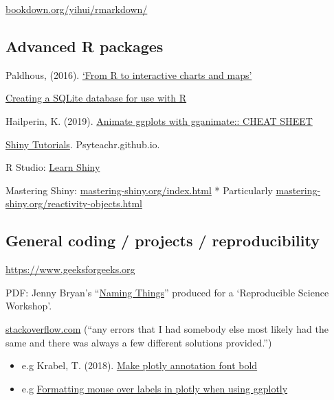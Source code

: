 \documentclass[
]{book}
\providecommand{\tightlist}{%
  \setlength{\itemsep}{0pt}\setlength{\parskip}{0pt}}
\begin{document}
\href{https://bookdown.org/yihui/rmarkdown/}{bookdown.org/yihui/rmarkdown/}

\hypertarget{advanced-r-packages}{%
\subsection{Advanced R packages}\label{advanced-r-packages}}

Paldhous, (2016). \href{https://paldhous.github.io/ucb/2016/dataviz/week13.html.}{`From R to interactive charts and maps'}

\href{https://data.library.virginia.edu/creating-a-sqlite-database-for-use-with-r/}{Creating a SQLite database for use with R}

Hailperin, K. (2019). \href{https://ugoproto.github.io/ugo_r_doc/pdf/gganimate.pdf}{Animate ggplots with gganimate:: CHEAT SHEET}

\href{https://psyteachr.gith\%20ub.io/shiny-tutorials/01-first-app.html.}{Shiny Tutorials}. Psyteachr.github.io.

R Studio: \href{https://shiny.rstudio.com/tutorial/}{Learn Shiny}

Mastering Shiny: \href{https://mastering-shiny.org/index.html}{mastering-shiny.org/index.html}
* Particularly \href{https://mastering-shiny.org/reactivity-objects.html}{mastering-shiny.org/reactivity-objects.html}

\hypertarget{general-coding-projects-reproducibility}{%
\subsection{General coding / projects / reproducibility}\label{general-coding-projects-reproducibility}}

\url{https://www.geeksforgeeks.org}

PDF: Jenny Bryan's ``\href{www2.stat.duke.edu/~rcs46/lectures_2015/01-markdown-git/slides/naming-slides/naming-slides.pdf}{Naming Things}'' produced for a `Reproducible Science Workshop'.

\href{https://stackoverflow.com/}{stackoverflow.com} (``any errors that I had somebody else most likely had the same and there was always a few different solutions provided.'')

\begin{itemize}
\tightlist
\item
  e.g Krabel, T. (2018). \href{https://stackoverflow.\%20com/questions/50067301/make-plotly-annotation-font-bold}{Make plotly annotation font bold}
\item
  e.g \href{https://stackoverflow.com/questions/34605919/formatting-mouse-over-labels-in-plotly-when-using-ggplotly}{Formatting mouse over labels in plotly when using ggplotly}
\end{itemize}
\end{document}
